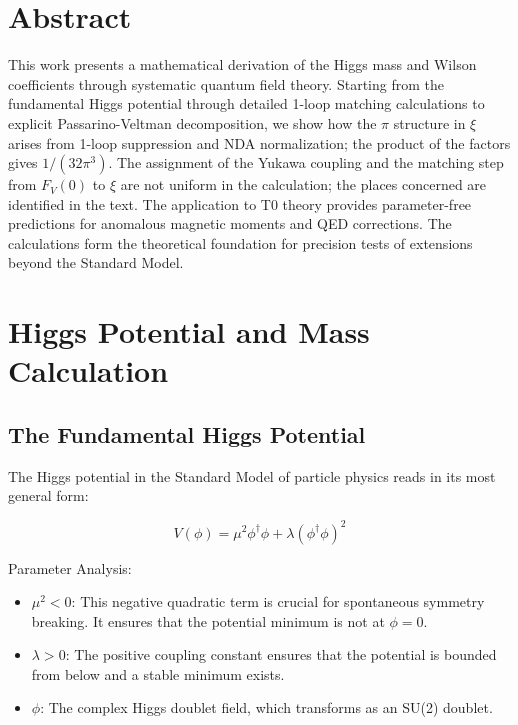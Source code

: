 \section*{Abstract}
		This work presents a mathematical derivation of the Higgs mass and Wilson coefficients through systematic quantum field theory. Starting from the fundamental Higgs potential through detailed 1-loop matching calculations to explicit Passarino-Veltman decomposition, we show how the $\pi$ structure in $\xi$ arises from 1-loop suppression and NDA normalization; the product of the factors gives $1/(32\pi^3)$. The assignment of the Yukawa coupling and the matching step from $F_V(0)$ to $\xi$ are not uniform in the calculation; the places concerned are identified in the text. The application to T0 theory provides parameter-free predictions for anomalous magnetic moments and QED corrections. The calculations form the theoretical foundation for precision tests of extensions beyond the Standard Model.

	

	\section{Higgs Potential and Mass Calculation}
	
	\subsection{The Fundamental Higgs Potential}
	
	The Higgs potential in the Standard Model of particle physics reads in its most general form:
	
	\begin{equation}
		V(\phi) = \mu^2 \phi^\dagger\phi + \lambda(\phi^\dagger\phi)^2
	\end{equation}
	
	\begin{important}
		Parameter Analysis:
		\begin{itemize}
			\item $\mu^2 < 0$: This negative quadratic term is crucial for spontaneous symmetry breaking. It ensures that the potential minimum is not at $\phi = 0$.
			\item $\lambda > 0$: The positive coupling constant ensures that the potential is bounded from below and a stable minimum exists.
			\item $\phi$: The complex Higgs doublet field, which transforms as an SU(2) doublet.
		\end{itemize}
	\end{important}
	
